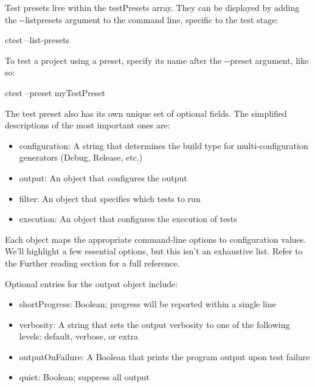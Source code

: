 Test presets live within the testPresets array. They can be displayed by adding the -{}-listpresets argument to the command line, specific to the test stage:

\begin{shell}
ctest --list-presets
\end{shell}

To test a project using a preset, specify its name after the -{}-preset argument, like so:

\begin{shell}
ctest --preset myTestPreset
\end{shell}

The test preset also has its own unique set of optional fields. The simplified descriptions of the most important ones are:

\begin{itemize}
\item
configuration: A string that determines the build type for multi-configuration generators (Debug, Release, etc.)

\item
output: An object that configures the output

\item
filter: An object that specifies which tests to run

\item
execution: An object that configures the execution of tests
\end{itemize}

Each object maps the appropriate command-line options to configuration values. We’ll highlight a few essential options, but this isn’t an exhaustive list. Refer to the Further reading section for a full reference.

Optional entries for the output object include:

\begin{itemize}
\item
shortProgress: Boolean; progress will be reported within a single line

\item
verbosity: A string that sets the output verbosity to one of the following levels: default, verbose, or extra

\item
outputOnFailure: A Boolean that prints the program output upon test failure

\item
quiet: Boolean; suppress all output
\end{itemize}

